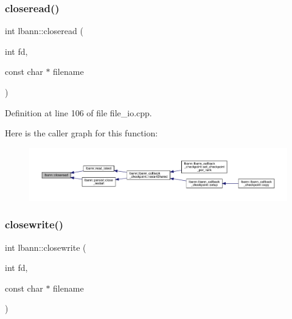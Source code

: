 \subsubsection{\texorpdfstring{closeread()}{closeread()}}
{\footnotesize\ttfamily int lbann\+::closeread (\begin{DoxyParamCaption}\item[{int}]{fd,  }\item[{const char $\ast$}]{filename }\end{DoxyParamCaption})}



Definition at line 106 of file file\+\_\+io.\+cpp.


Here is the caller graph for this function\+:\nopagebreak
\begin{figure}[H]
\begin{center}
\leavevmode
\includegraphics[width=350pt]{namespacelbann_a38dd30b2ae8214f6595708264369ddb8_icgraph}
\end{center}
\end{figure}
\mbox{\label{namespacelbann_aceeccedbbafccfa071b21ee99be794a5}} 
\subsubsection{\texorpdfstring{closewrite()}{closewrite()}}
{\footnotesize\ttfamily int lbann\+::closewrite (\begin{DoxyParamCaption}\item[{int}]{fd,  }\item[{const char $\ast$}]{filename }\end{DoxyParamCaption})}



